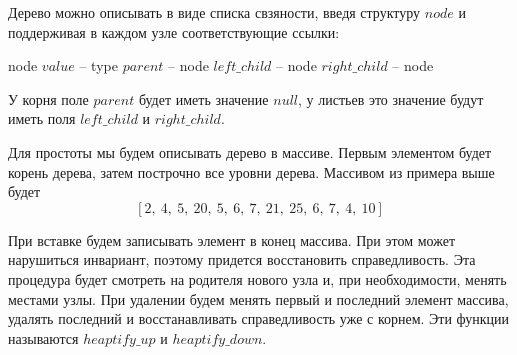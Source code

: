 \documentclass[../main.tex]{subfiles}
\begin{document}
	 \begin{center}
	 \end{center}

	Дерево можно описывать в виде списка свзяности, введя структуру $node$ и поддерживая в каждом узле соответствующие ссылки:
	
	\begin{struct}{node}
		\State $value$ -- type
		\State $parent$ -- node
		\State $left\_child$ -- node
		\State $right\_child$ -- node
	\end{struct}
	
	У корня поле $parent$ будет иметь значение $null$, у листьев это значение будут иметь поля $left\_child$ и  $right\_child$.
	
	Для простоты мы будем описывать дерево в массиве. Первым элементом будет корень дерева, затем построчно все уровни дерева. Массивом из примера выше будет
	\[
	[2, \ 4, \ 5, \ 20, \ 5, \ 6, \ 7, \ 21, \ 25, \ 6, \ 7, \ 4, \ 10]
	\]
	
	При вставке будем записывать элемент в конец массива. При этом может нарушиться инвариант, поэтому придется восстановить справедливость. Эта процедура будет смотреть на родителя нового узла и, при необходимости, менять местами узлы. При удалении будем менять первый и последний элемент массива, удалять последний и восстанавливать справедливость уже с корнем. Эти функции называются $heaptify\_up$ и $heaptify\_down$.
\end{document}
